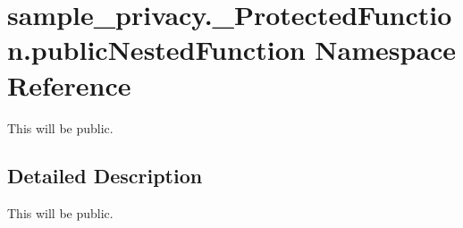 \hypertarget{namespacesample__privacy_1_1___protected_function_1_1public_nested_function}{\section{sample\-\_\-privacy.\-\_\-\-Protected\-Function.\-public\-Nested\-Function Namespace Reference}
\label{namespacesample__privacy_1_1___protected_function_1_1public_nested_function}
}


This will be public.  




\subsection{Detailed Description}
This will be public. 